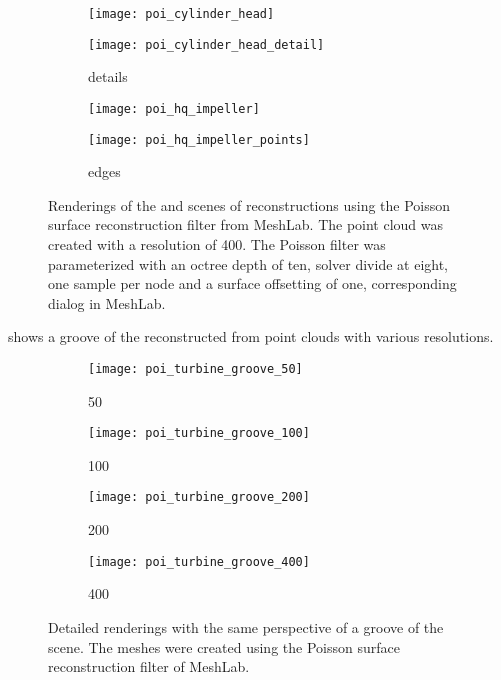 \begin{figure}
	\centering
	\begin{subfigure}[b]{0.49\textwidth}
		\centering
		\texttt{[image: poi\_cylinder\_head]}
		\caption{\cylinderhead}
		\label{fig:poi_cylinder_head}
	\end{subfigure}
	\begin{subfigure}[b]{0.49\textwidth}
		\centering
		\texttt{[image: poi\_cylinder\_head\_detail]}
		\caption{\cylinderhead details}
		\label{fig:poi_cylinder_head_detail}
	\end{subfigure}
	\begin{subfigure}[b]{0.49\textwidth}
		\centering
		\texttt{[image: poi\_hq\_impeller]}
		\caption{\impeller}
		\label{fig:poi_hq_impeller}
	\end{subfigure}
	\begin{subfigure}[b]{0.49\textwidth}
		\centering
		\texttt{[image: poi\_hq\_impeller\_points]}
		\caption{\impeller edges}
		\label{fig:poi_hq_impeller_points}
	\end{subfigure}
	\caption[Poisson result renderings]{
		Renderings of the \cylinderhead and \impeller scenes of reconstructions using the Poisson surface reconstruction filter from MeshLab.
		The point cloud was created with a resolution of 400.
		The Poisson filter was parameterized with an octree depth of ten, solver divide at eight, one sample per node and a surface offsetting of one, \cf corresponding dialog in MeshLab.
	}
	\label{fig:poisson_results}
\end{figure}

 shows a groove of the \turbine reconstructed from point clouds with various resolutions.

\begin{figure}
	\begin{subfigure}[b]{0.24\textwidth}
		\centering
		\texttt{[image: poi\_turbine\_groove\_50]}
		\caption{50}
		\label{fig:poi_turbine_groove_50}
	\end{subfigure}
	\begin{subfigure}[b]{0.24\textwidth}
		\centering
		\texttt{[image: poi\_turbine\_groove\_100]}
		\caption{100}
		\label{fig:poi_turbine_groove_100}
	\end{subfigure}
	\begin{subfigure}[b]{0.24\textwidth}
		\centering
		\texttt{[image: poi\_turbine\_groove\_200]}
		\caption{200}
		\label{fig:poi_turbine_groove_200}
	\end{subfigure}
	\begin{subfigure}[b]{0.24\textwidth}
		\centering
		\texttt{[image: poi\_turbine\_groove\_400]}
		\caption{400}
		\label{fig:poi_turbine_groove_400}
	\end{subfigure}
	\caption[Poisson \turbine grooves]{
		Detailed renderings with the same perspective of a groove of the \turbine scene.
		The meshes were created using the Poisson surface reconstruction filter of MeshLab.
	}
	\label{fig:poi_grooves}
\end{figure}

\endgroup
